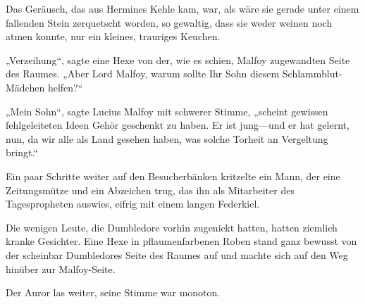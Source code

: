 Das Geräusch, das aus Hermines Kehle kam, war, als wäre sie gerade unter einem fallenden Stein zerquetscht worden, so gewaltig, dass sie weder weinen noch atmen konnte, nur ein kleines, trauriges Keuchen.

„Verzeihung“, sagte eine Hexe von der, wie es schien, Malfoy zugewandten Seite des Raumes. „Aber Lord Malfoy, warum sollte Ihr Sohn diesem Schlammblut-Mädchen helfen?“

„Mein Sohn“, sagte Lucius Malfoy mit schwerer Stimme, „scheint gewissen fehlgeleiteten Ideen Gehör geschenkt zu haben. Er ist jung—und er hat gelernt, nun, da wir alle als Land gesehen haben, was solche Torheit an Vergeltung bringt.“

Ein paar Schritte weiter auf den Besucherbänken kritzelte ein Mann, der eine Zeitungsmütze und ein Abzeichen trug, das ihn als Mitarbeiter des Tagespropheten auswies, eifrig mit einem langen Federkiel.

Die wenigen Leute, die Dumbledore vorhin zugenickt hatten, hatten ziemlich kranke Gesichter. Eine Hexe in pflaumenfarbenen Roben stand ganz bewusst von der scheinbar Dumbledores Seite des Raumes auf und machte sich auf den Weg hinüber zur Malfoy-Seite.

Der Auror las weiter, seine Stimme war monoton.

